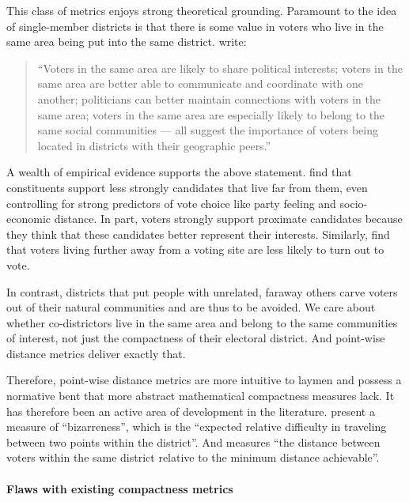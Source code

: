\documentclass[]{article}
\let\oldparagraph\paragraph
\renewcommand{\paragraph}[1]{\oldparagraph{#1}\mbox{}}
\begin{document}
This class of metrics enjoys strong theoretical grounding. Paramount to
the idea of single-member districts is that there is some value in
voters who live in the same area being put into the same district.
\cite{er2019} write:

\begin{quote}
``Voters in the same area are likely to share political interests;
voters in the same area are better able to communicate and coordinate
with one another; politicians can better maintain connections with
voters in the same area; voters in the same area are especially likely
to belong to the same social communities --- all suggest the importance
of voters being located in districts with their geographic peers.''
\end{quote}

A wealth of empirical evidence supports the above statement.
\cite{arzheimer2012} find that constituents support less strongly
candidates that live far from them, even controlling for strong
predictors of vote choice like party feeling and socio-economic
distance. In part, voters strongly support proximate candidates because
they think that these candidates better represent their interests.
Similarly, \cite{dyck2005} find that voters living further away from a
voting site are less likely to turn out to vote.

In contrast, districts that put people with unrelated, faraway others
carve voters out of their natural communities and are thus to be
avoided. We care about whether co-districtors live in the same area and
belong to the same communities of interest, not just the compactness of
their electoral district. And point-wise distance metrics deliver
exactly that.

Therefore, point-wise distance metrics are more intuitive to laymen and
possess a normative bent that more abstract mathematical compactness
measures lack. It has therefore been an active area of development in
the literature. \cite{cm2010} present a measure of ``bizarreness'',
which is the ``expected relative difficulty in traveling between two
points within the district''. And \cite{fh2011} measures ``the distance
between voters within the same district relative to the minimum distance
achievable''.

\hypertarget{flaws-with-existing-compactness-metrics}{%
\paragraph{Flaws with existing compactness
metrics}\label{flaws-with-existing-compactness-metrics}}
\end{document}
